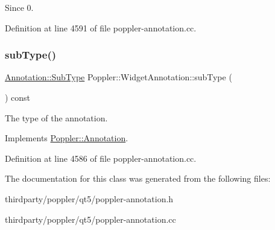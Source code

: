 \begin{DoxySince}{Since}
0. 
\end{DoxySince}


Definition at line 4591 of file poppler-\/annotation.\+cc.

\mbox{\label{class_poppler_1_1_widget_annotation_a7ddc61e33e4418459f3a266ceea2b5a4}} 
\subsubsection{\texorpdfstring{sub\+Type()}{subType()}}
{\footnotesize\ttfamily \hyperlink{class_poppler_1_1_annotation_a2d592999c330949d64679cfa9e81113f}{Annotation\+::\+Sub\+Type} Poppler\+::\+Widget\+Annotation\+::sub\+Type (\begin{DoxyParamCaption}{ }\end{DoxyParamCaption}) const\hspace{0.3cm}{\ttfamily [virtual]}}

The type of the annotation. 

Implements \hyperlink{class_poppler_1_1_annotation_aef7fa1532193b41fbeba6e577579d984}{Poppler\+::\+Annotation}.



Definition at line 4586 of file poppler-\/annotation.\+cc.



The documentation for this class was generated from the following files\+:\begin{DoxyCompactItemize}
\item 
thirdparty/poppler/qt5/poppler-\/annotation.\+h\item 
thirdparty/poppler/qt5/poppler-\/annotation.\+cc\end{DoxyCompactItemize}
